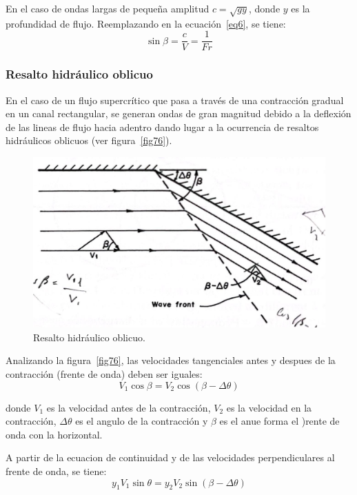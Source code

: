\documentclass[11pt, oneside]{article}
\begin{document}
En el caso de ondas largas de pequeña amplitud $c = \sqrt{gy}$, donde $y$ es la profundidad de flujo. Reemplazando en la ecuaci\'on~\ref{eq6}, se tiene:
\begin{equation}
    \sin \beta =  \frac{c}{V} = \frac{1}{Fr}
    \label{eq6}
\end{equation}

\subsubsection{Resalto hidr\'aulico oblicuo}
En el caso de un flujo supercr\'itico que pasa a trav\'es de una contracci\'on gradual en un canal rectangular, se generan ondas de gran magnitud debido a la deflexi\'on de las lineas de flujo hacia adentro dando lugar a la ocurrencia de resaltos hidr\'aulicos oblicuos (ver figura~\ref{fig76}). 
\begin{figure}[h]
    \centering
    \includegraphics[width=0.8\linewidth]{fig76.jpeg}
    \caption{Resalto hidr\'aulico oblicuo.}
    \label{fig75}
\end{figure}

Analizando la figura~\ref{fig76}, las velocidades tangenciales antes y despues de la contracci\'on (frente de onda) deben ser iguales:
\begin{equation}
   V_1 \cos \beta = V_2 \cos \left(\beta - \Delta \theta \right)
    \label{eq6a}
\end{equation}

donde $V_1$ es la velocidad antes de la contracci\'on, $V_2$ es la velocidad en la contracci\'on, $\Delta \theta$ es el angulo de la contracci\'on y $\beta$ es el anue forma el )rente de onda con la horizontal. 

A partir de la ecuacion de continuidad y de las velocidades perpendiculares al frente de onda, se tiene:
\begin{equation}
   y_1 V_1 \sin \theta = y_2 V_2 \sin \left(\beta - \Delta \theta \right)
    \label{eq7}
\end{equation}
\end{document}
